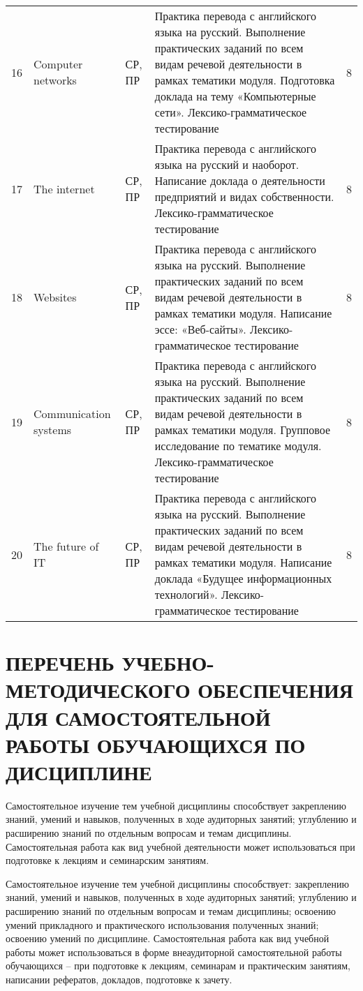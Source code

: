 \begin{center}
\begin{longtable}{p{} p{} p{} p{} p{}}
16 & Computer networks & СР, ПР & Практика перевода с английского языка на русский. Выполнение практических заданий по всем видам речевой деятельности в рамках тематики модуля. 
Подготовка доклада на тему «Компьютерные сети».  Лексико-грамматическое тестирование& 8 \\
17 & The internet & СР, ПР & Практика перевода с английского языка на русский и наоборот. Написание доклада о деятельности предприятий и видах собственности. Лексико-грамматическое тестирование & 8 \\
18 & Websites & СР, ПР & Практика перевода с английского языка на русский. Выполнение практических заданий по всем видам речевой деятельности в рамках тематики модуля. Написание эссе: «Веб-сайты». Лексико-грамматическое тестирование & 8 \\
19 & Communication systems & СР, ПР & Практика перевода с английского языка на русский. Выполнение практических заданий по всем видам речевой деятельности в рамках тематики модуля. Групповое исследование по тематике модуля. Лексико-грамматическое тестирование & 8 \\
20 & The future of IT & СР, ПР & Практика перевода с английского языка на русский. Выполнение практических заданий по всем видам речевой деятельности в рамках тематики модуля. Написание доклада «Будущее информационных технологий». Лексико-грамматическое тестирование & 8 \\
\end{longtable}
\end{center}

\chapter{ПЕРЕЧЕНЬ УЧЕБНО-МЕТОДИЧЕСКОГО ОБЕСПЕЧЕНИЯ ДЛЯ САМОСТОЯТЕЛЬНОЙ РАБОТЫ ОБУЧАЮЩИХСЯ ПО ДИСЦИПЛИНЕ}
\label{chapt5}
Самостоятельное изучение тем учебной дисциплины способствует закреплению знаний, умений и навыков, полученных в ходе аудиторных занятий; углублению и расширению знаний по отдельным вопросам и темам дисциплины. Самостоятельная работа как вид учебной деятельности может использоваться при подготовке к лекциям и семинарским занятиям.


Самостоятельное изучение тем учебной дисциплины способствует: закреплению знаний, умений и навыков, полученных в ходе аудиторных занятий; углублению и расширению знаний по отдельным вопросам и темам дисциплины; освоению умений прикладного и практического использования полученных знаний; освоению умений по дисциплине. Самостоятельная работа как вид учебной работы может использоваться в форме внеаудиторной самостоятельной работы обучающихся – при подготовке к лекциям, семинарам и практическим занятиям, написании рефератов, докладов, подготовке к зачету.

